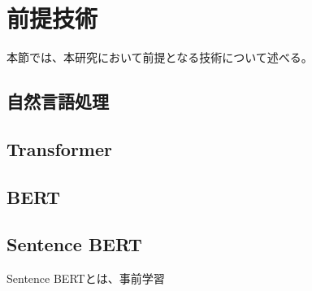 


\section{前提技術}
本節では、本研究において前提となる技術について述べる。

\subsection{自然言語処理}

\subsection{Transformer}

\subsection{BERT}

\subsection{Sentence BERT}
Sentence BERTとは、事前学習

